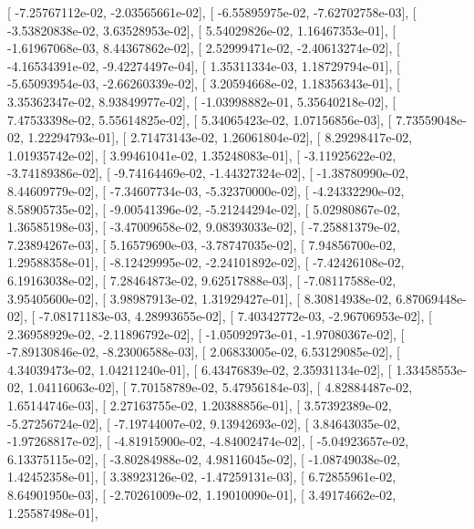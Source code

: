 \documentclass{article}
\begin{document}
       [ -7.25767112e-02,  -2.03565661e-02],
       [ -6.55895975e-02,  -7.62702758e-03],
       [ -3.53820838e-02,   3.63528953e-02],
       [  5.54029826e-02,   1.16467353e-01],
       [ -1.61967068e-03,   8.44367862e-02],
       [  2.52999471e-02,  -2.40613274e-02],
       [ -4.16534391e-02,  -9.42274497e-04],
       [  1.35311334e-03,   1.18729794e-01],
       [ -5.65093954e-03,  -2.66260339e-02],
       [  3.20594668e-02,   1.18356343e-01],
       [  3.35362347e-02,   8.93849977e-02],
       [ -1.03998882e-01,   5.35640218e-02],
       [  7.47533398e-02,   5.55614825e-02],
       [  5.34065423e-02,   1.07156856e-03],
       [  7.73559048e-02,   1.22294793e-01],
       [  2.71473143e-02,   1.26061804e-02],
       [  8.29298417e-02,   1.01935742e-02],
       [  3.99461041e-02,   1.35248083e-01],
       [ -3.11925622e-02,  -3.74189386e-02],
       [ -9.74164469e-02,  -1.44327324e-02],
       [ -1.38780990e-02,   8.44609779e-02],
       [ -7.34607734e-03,  -5.32370000e-02],
       [ -4.24332290e-02,   8.58905735e-02],
       [ -9.00541396e-02,  -5.21244294e-02],
       [  5.02980867e-02,   1.36585198e-03],
       [ -3.47009658e-02,   9.08393033e-02],
       [ -7.25881379e-02,   7.23894267e-03],
       [  5.16579690e-03,  -3.78747035e-02],
       [  7.94856700e-02,   1.29588358e-01],
       [ -8.12429995e-02,  -2.24101892e-02],
       [ -7.42426108e-02,   6.19163038e-02],
       [  7.28464873e-02,   9.62517888e-03],
       [ -7.08117588e-02,   3.95405600e-02],
       [  3.98987913e-02,   1.31929427e-01],
       [  8.30814938e-02,   6.87069448e-02],
       [ -7.08171183e-03,   4.28993655e-02],
       [  7.40342772e-03,  -2.96706953e-02],
       [  2.36958929e-02,  -2.11896792e-02],
       [ -1.05092973e-01,  -1.97080367e-02],
       [ -7.89130846e-02,  -8.23006588e-03],
       [  2.06833005e-02,   6.53129085e-02],
       [  4.34039473e-02,   1.04211240e-01],
       [  6.43476839e-02,   2.35931134e-02],
       [  1.33458553e-02,   1.04116063e-02],
       [  7.70158789e-02,   5.47956184e-03],
       [  4.82884487e-02,   1.65144746e-03],
       [  2.27163755e-02,   1.20388856e-01],
       [  3.57392389e-02,  -5.27256724e-02],
       [ -7.19744007e-02,   9.13942693e-02],
       [  3.84643035e-02,  -1.97268817e-02],
       [ -4.81915900e-02,  -4.84002474e-02],
       [ -5.04923657e-02,   6.13375115e-02],
       [ -3.80284988e-02,   4.98116045e-02],
       [ -1.08749038e-02,   1.42452358e-01],
       [  3.38923126e-02,  -1.47259131e-03],
       [  6.72855961e-02,   8.64901950e-03],
       [ -2.70261009e-02,   1.19010090e-01],
       [  3.49174662e-02,   1.25587498e-01],
\end{document}
